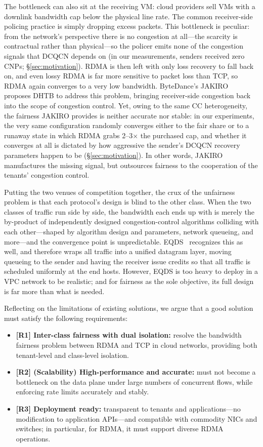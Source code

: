 The bottleneck can also sit at the receiving VM: cloud providers sell
VMs with a downlink bandwidth cap below the physical line rate. The
common receiver-side policing practice is simply dropping excess
packets. This bottleneck is peculiar: from the network's perspective
there is no congestion at all---the scarcity is contractual rather than
physical---so the policer emits none of the congestion signals that
DCQCN depends on (in our measurements, senders received zero CNPs;
\S\ref{sec:motivation}). RDMA is then left with only loss recovery to
fall back on, and even lossy RDMA is far more sensitive to packet loss
than TCP, so RDMA again converges to a very low bandwidth. ByteDance's
JAKIRO~\cite{jakiro} proposes DHTB to address this problem, bringing
receiver-side congestion back into the scope of congestion control. Yet,
owing to the same CC heterogeneity, the fairness JAKIRO provides is
neither accurate nor stable: in our experiments, the very same
configuration randomly converges either to the fair share or to a
runaway state in which RDMA grabs 2--3$\times$ the purchased cap, and
whether it converges at all is dictated by how aggressive the sender's
DCQCN recovery parameters happen to be (\S\ref{sec:motivation}). In
other words, JAKIRO manufactures the missing signal, but outsources
fairness to the cooperation of the tenants' congestion control.

Putting the two venues of competition together, the crux of the
unfairness problem is that each protocol's design is blind to the other
class. When the two classes of traffic run side by side, the bandwidth
each ends up with is merely the by-product of independently designed
congestion-control algorithms colliding with each other---shaped by
algorithm design and parameters, network queueing, and more---and the
convergence point is unpredictable. EQDS~\cite{eqds} recognizes this as
well, and therefore wraps all traffic into a unified datagram layer,
moving queueing to the sender and having the receiver issue credits so
that all traffic is scheduled uniformly at the end hosts. However, EQDS
is too heavy to deploy in a VPC network to be realistic; and for
fairness as the sole objective, its full design is far more than what is
needed.

Reflecting on the limitations of existing solutions, we argue that a
good solution must satisfy the following requirements:

\begin{itemize}
  \item \textbf{[R1] Inter-class fairness with dual isolation:} resolve
  the bandwidth fairness problem between RDMA and TCP in cloud networks,
  providing both tenant-level and class-level isolation.
  \item \textbf{[R2] (Scalability) High-performance and accurate:} must
  not become a bottleneck on the data plane under large numbers of
  concurrent flows, while enforcing rate limits accurately and stably.
  \item \textbf{[R3] Deployment ready:} transparent to tenants and
  applications---no modification to application APIs---and compatible
  with commodity NICs and switches; in particular, for RDMA, it must
  support diverse RDMA operations.
\end{itemize}

